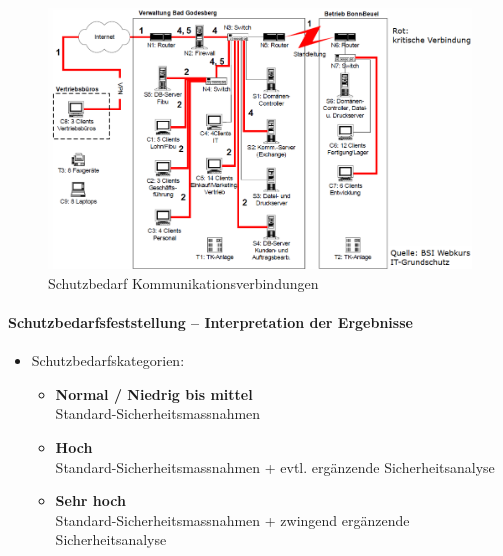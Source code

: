\documentclass[10pt,a4paper]{article}
\begin{document}
\begin{figure}[H]
    \begin{center}
    \includegraphics[width=12cm]{images/Schutzbedarf Kommunikationsverbindungen.png}
    \caption{Schutzbedarf Kommunikationsverbindungen}
    \label{Schutzbedarf Kommunikationsverbindungen}
    \end{center}
\end{figure}

\paragraph*{Schutzbedarfsfeststellung – Interpretation der Ergebnisse}
\begin{itemize}[noitemsep,topsep=0pt,leftmargin=*]
    \item Schutzbedarfskategorien:
    \begin{itemize}[noitemsep,topsep=0pt,leftmargin=*]
        \item \textbf{Normal / Niedrig bis mittel}\\
        Standard-Sicherheitsmassnahmen
        \item \textbf{Hoch}\\
        Standard-Sicherheitsmassnahmen + evtl. ergänzende Sicherheitsanalyse
        \item \textbf{Sehr hoch}\\
        Standard-Sicherheitsmassnahmen + zwingend ergänzende Sicherheitsanalyse
    \end{itemize}
\end{itemize}
\end{document}
